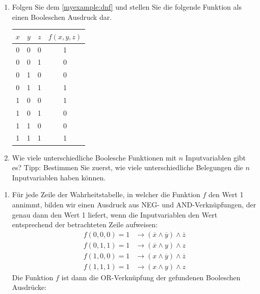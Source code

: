 \begin{myexercise}\label{myexercise:UebZuDNF}
    \begin{enumerate}
        \item Folgen Sie dem \cref{myexample:dnf} und stellen Sie die folgende Funktion als einen Booleschen Ausdruck dar.
        \begin{center}
            \begin{tabular}{c|c|c||c}
                $x$&$y$&$z$&$f(x,y,z)$ \\
                \hline
                0&0&0&1 \\
                0&0&1&0 \\
                0&1&0&0 \\
                0&1&1&1 \\
                1&0&0&1 \\
                1&0&1&0 \\
                1&1&0&0 \\
                1&1&1&1  
            \end{tabular}
        \end{center}
        \item Wie viele unterschiedliche Boolesche Funktionen mit $n$ Inputvariablen gibt es? \newline Tipp: Bestimmen Sie zuerst, wie viele unterschiedliche Belegungen die $n$ Inputvariablen haben können. 
    \end{enumerate}
\begin{myanswer}
    \begin{enumerate}
        \item Für jede Zeile der Wahrheitstabelle, in welcher die Funktion $f$ den Wert 1 annimmt, bilden wir einen Ausdruck aus NEG- und AND-Verknüpfungen, der genau dann den Wert 1 liefert, wenn die Inputvariablen den Wert entsprechend der betrachteten Zeile aufweisen:
        \begin{align*}
            f(0,0,0) = 1 &\longrightarrow (\overline{x} \wedge \overline{y}) \wedge \overline{z} \\
            f(0,1,1) = 1 &\longrightarrow (\overline{x} \wedge y) \wedge z\\
            f(1,0,0) = 1 &\longrightarrow (x \wedge \overline{y}) \wedge \overline{z}\\
            f(1,1,1) = 1 &\longrightarrow (x \wedge y) \wedge z
        \end{align*}
        Die Funktion $f$ ist dann die OR-Verknüpfung der gefundenen Booleschen Ausdrücke:

\end{enumerate}
\end{myanswer}
\end{myexercise}
